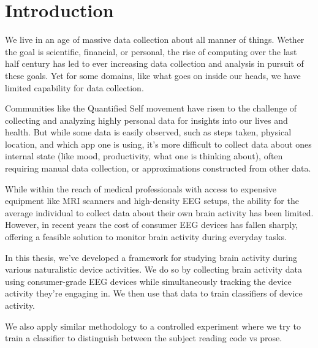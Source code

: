 \section{Introduction}



We live in an age of massive data collection about all manner of things. Wether the goal is scientific, financial, or personal, the rise of computing over the last half century has led to ever increasing data collection and analysis in pursuit of these goals. Yet for some domains, like what goes on inside our heads, we have limited capability for data collection.

Communities like the Quantified Self movement have risen to the challenge of collecting and analyzing highly personal data for insights into our lives and health. But while some data is easily observed, such as steps taken, physical location, and which app one is using, it's more difficult to collect data about ones internal state (like mood, productivity, what one is thinking about), often requiring manual data collection, or approximations constructed from other data.



While within the reach of medical professionals with access to expensive equipment like MRI scanners and high-density EEG setups, the ability for the average individual to collect data about their own brain activity has been limited. However, in recent years the cost of consumer EEG devices has fallen sharply, offering a feasible solution to monitor brain activity during everyday tasks.



In this thesis, we've developed a framework for studying brain activity during various naturalistic device activities. We do so by collecting brain activity data using consumer-grade EEG devices while simultaneously tracking the device activity they're engaging in. We then use that data to train classifiers of device activity.

We also apply similar methodology to a controlled experiment where we try to train a classifier to distinguish between the subject reading code vs prose.
